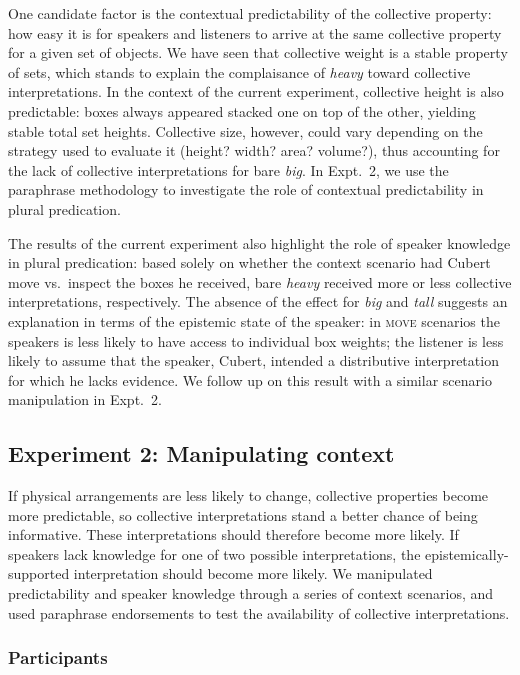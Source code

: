 \documentclass[linguex]{sp}
\begin{document}
One candidate factor is the contextual predictability of the collective property: how easy it is for speakers and listeners to arrive at the same collective property for a given set of objects. We have seen that collective weight is a stable property of sets, which stands to explain the complaisance of \emph{heavy} toward collective interpretations. In the context of the current experiment, collective height is also predictable: boxes always appeared stacked one on top of the other, yielding stable total set heights. Collective size, however, could vary depending on the strategy used to evaluate it (height? width? area? volume?), thus accounting for the lack of collective interpretations for bare \emph{big}. In Expt.~2, we use the paraphrase methodology to investigate the role of contextual predictability in plural predication.

The results of the current experiment also highlight the role of speaker knowledge in plural predication: based solely on whether the context scenario had Cubert move vs.~inspect the boxes he received, bare \emph{heavy} received more or less collective interpretations, respectively. The absence of the effect for \emph{big} and \emph{tall} suggests an explanation in terms of the epistemic state of the speaker: in \textsc{move} scenarios the speakers is less likely to have access to individual box weights; the listener is less likely to assume that the speaker, Cubert, intended a distributive interpretation for which he lacks evidence. We follow up on this result with a similar scenario manipulation in Expt.~2.

\subsection{Experiment 2: Manipulating context}

If physical arrangements are less likely to change, collective properties become more predictable, so collective interpretations stand a better chance of being informative. These interpretations should therefore become more likely. If speakers lack knowledge for one of two possible interpretations, the epistemically-supported interpretation should become more likely. We manipulated predictability and speaker knowledge through a series of context scenarios, and used paraphrase endorsements to test the availability of collective interpretations.

\subsubsection{Participants}
\end{document}
